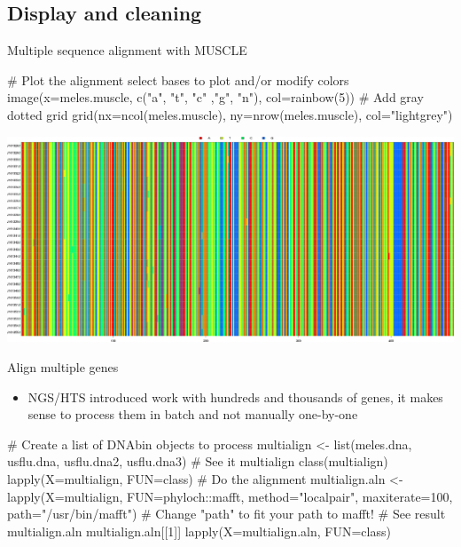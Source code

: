 \documentclass[compress, ucs, xelatex, 11pt, xcolor=svgnames,
  hyperref={
    bookmarks=true,
    unicode=true,
    colorlinks=true,
    pdftitle={Molecular data in R},
    plainpages=false,
    pdfauthor={Vojtech Zeisek},
    pdfsubject={Course about phylogeny and evolution in R},
    pdfcreator={XeLaTeX},
    pdfkeywords={R, evolution, phylogeny, molecular data},
    linkcolor=Tomato,
    anchorcolor=SaddleBrown,
    citecolor=Goldenrod,
    filecolor=DarkMagenta,
    menucolor=Sienna,
    urlcolor=DarkTurquoise,
    pdftex},
  url={hyphens, lowtilde} %
  ]{beamer}
\begin{document}
\subsection{Display and cleaning}

\begin{frame}[fragile]{Multiple sequence alignment with MUSCLE}
  \begin{spluscode}
    # Plot the alignment select bases to plot and/or modify colors
    image(x=meles.muscle, c("a", "t", "c" ,"g", "n"), col=rainbow(5))
    # Add gray dotted grid
    grid(nx=ncol(meles.muscle), ny=nrow(meles.muscle), col="lightgrey")
  \end{spluscode}
  \vfill
  \includegraphics[width=\textwidth]{muscle.png}
\end{frame}

\begin{frame}[fragile]{Align multiple genes}
  \begin{itemize}
    \item NGS/HTS introduced work with hundreds and thousands of genes, it makes sense to process them in batch and not manually one-by-one
  \end{itemize}
  \begin{spluscode}
    # Create a list of DNAbin objects to process
    multialign <- list(meles.dna, usflu.dna, usflu.dna2, usflu.dna3)
    # See it
    multialign
    class(multialign)
    lapply(X=multialign, FUN=class)
    # Do the alignment
    multialign.aln <- lapply(X=multialign, FUN=phyloch::mafft,
       method="localpair", maxiterate=100, path="/usr/bin/mafft")
      # Change "path" to fit your path to mafft!
    # See result
    multialign.aln
    multialign.aln[[1]]
    lapply(X=multialign.aln, FUN=class)
  \end{spluscode}
\end{frame}
\end{document}
